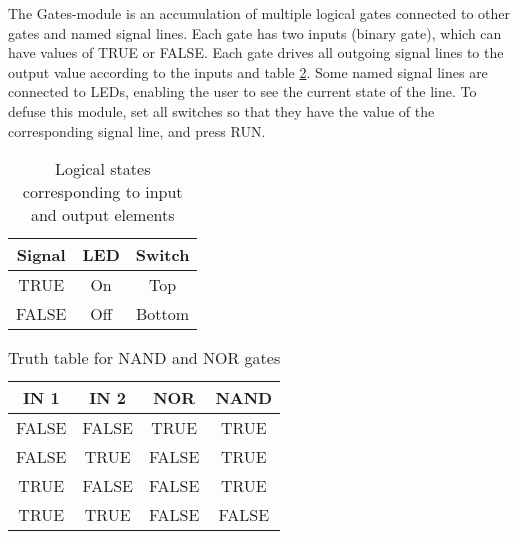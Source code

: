 \documentclass[a4paper]{report}
\author{hephaisto}
\title{\moduleTitle}
\begin{document}

The Gates-module is an accumulation of multiple logical gates connected to other gates and named signal lines.
Each gate has two inputs (binary gate), which can have values of TRUE or FALSE.
Each gate drives all outgoing signal lines to the output value according to the inputs and table \ref{tab:b_truthtable}.
Some named signal lines are connected to LEDs, enabling the user to see the current state of the line.
To defuse this module, set all switches so that they have the value of the corresponding signal line, and press RUN.



\begin{table}
	\centering
	\begin{tabular}{|ccc|}\hline
		Signal & LED & Switch \\\hline
		TRUE & On & Top \\
		FALSE & Off & Bottom \\\hline
	\end{tabular}
	\caption{Logical states corresponding to input and output elements}
	\label{tab:b_io_logic}
\end{table}

\begin{table}
	\centering
	\begin{tabular}{|cc|cc|}\hline
		IN 1 & IN 2 & NOR & NAND \\\hline
		FALSE & FALSE & TRUE & TRUE \\
		FALSE & TRUE & FALSE & TRUE \\
		TRUE & FALSE & FALSE & TRUE \\
		TRUE & TRUE & FALSE & FALSE \\\hline
	\end{tabular}
	\caption{Truth table for NAND and NOR gates}
	\label{tab:b_truthtable}
\end{table}



\end{document}
